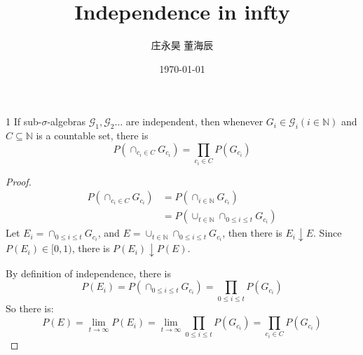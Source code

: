 \documentclass[UTF8, a4paper, linespread=1.5]{article}
\title{Independence in infty}
\date{\today}
\author{庄永昊 董海辰}
\begin{document}
\maketitle
\begin{thm}{}{1}
    If sub-$\sigma$-algebras $\mathcal G_1,\mathcal G_2\dots$ are independent, then whenever 
    $G_i\in\mathcal G_i(i\in \mathbb N)$ and $C\subseteq\mathbb N$ is a countable set, there is 
    $$P(\cap_{c_i\in C}G_{c_i})=\prod_{c_i\in C}P(G_{c_i})$$
\end{thm}
\begin{proof}[Proof]
    \begin{align*}
        P(\cap_{c_i\in C}G_{c_i}) &= P(\cap_{i\in\mathbb N}G_{c_i})\\
        &= P(\cup_{t\in\mathbb N}\cap_{0\leq i\leq t}G_{c_i})
    \end{align*}
    Let $E_i=\cap_{0\leq i\leq t}G_{c_i}$, and $E=\cup_{t\in\mathbb N}\cap_{0\leq i\leq t}G_{c_i}$, 
    then there is $E_i\downarrow E$. Since $P(E_i)\in[0,1)$, there is $P(E_i)\downarrow P(E)$.
    
    By definition of independence, there is 
    $$P(E_i)=P(\cap_{0\leq i\leq t}G_{c_i})=\prod_{0\leq i\leq t}P(G_{c_i})$$
    So there is: 
    $$P(E)=\lim_{t\rightarrow \infty} P(E_i)=\lim_{t\rightarrow\infty}\prod_{0\leq i\leq t}P(G_{c_i})=\prod_{c_i\in C}P(G_{c_i})$$
\end{proof}
\end{document}
